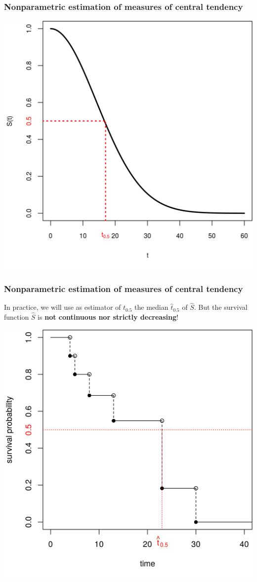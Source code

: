 \documentclass[12pt, 
hyperref={colorlinks=true, linkcolor=blue, urlcolor=cyan},dvipsnames]{beamer}
\begin{document}
\begin{frame}
\frametitle{Nonparametric estimation of measures of central tendency}
\centering
\includegraphics[width=0.8\textheight]{figs/survival_function_median.png}
\end{frame}

\begin{frame}
\frametitle{Nonparametric estimation of measures of central tendency}
In practice, we will use as estimator of $t_{0.5}$ the median $\hat{t}_{0.5}$ of $\widehat{S}$. But the survival function $\widehat{S}$ is \textbf{not continuous nor strictly decreasing}!

\begin{center}
\includegraphics[width=0.6\textheight]{figs/km_small_example_median.png}
\end{center}
\end{frame}
\end{document}
